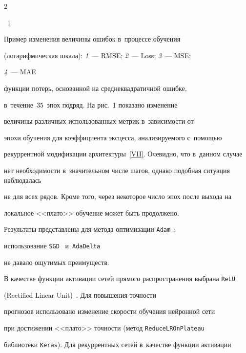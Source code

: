 \begin{multicols}{2}
{{{\figurename~1}\ \ \small{Пример изменения величины ошибок в~процессе обучения

 (логарифмическая шкала): \textit{1}~--- RMSE; \textit{2}~--- Loss; \textit{3}~--- MSE;

 \textit{4}~--- MAE}}

}



\vspace*{11pt}



\addtocounter{figure}{1}





\noindent

 функции потерь, основанной на среднеквадратичной ошибке, 

в~течение~$35$~эпох подряд. На рис.~1 показано изменение 

величины различных использованных метрик в~зависимости от 

эпохи обучения для коэффициента эксцесса, анализируемого с~помощью 

рекуррентной модификации архитектуры~\ref{VII}. Очевидно, что в~данном случае 

нет необходимости в~значительном числе шагов, однако подобная ситуация наблюдалась 

не для всех рядов. Кроме того, через некоторое число эпох после выхода на 

локальное <<плато>> обучение может быть продолжено.







Результаты представлены для метода оптимизации \verb"Adam"~\cite{Kingma2014}; 

использование \verb"SGD"~\cite{Buduma2017} и~\verb"AdaDelta"~\cite{Zeiler2012} 

не давало ощутимых преимуществ.

В качестве функции активации сетей прямого распространения выбрана \verb"ReLU" 

(Rectified Linear Unit)~\cite{Glorot2011}. Для повышения точ\-ности 

прогнозов использовано изменение скорости обучения нейронной сети 

при достижении <<плато>> точности (метод \verb"ReduceLROnPlateau" 

библиотеки \verb"Keras"). Для рекуррентных сетей в~качестве функции активации 


\end{multicols}
